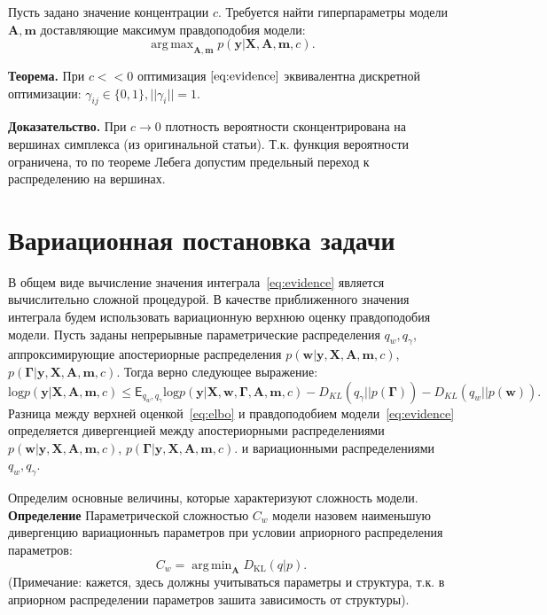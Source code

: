 \documentclass[12pt]{article}
\DeclareMathOperator*{\argmin}{arg\,min}
\DeclareMathOperator*{\argmax}{arg\,max}
\begin{document}
Пусть задано значение концентрации $c$. 
Требуется найти гиперпараметры модели $\mathbf{A}, \mathbf{m}$ доставляющие максимум правдоподобия модели:
\[
    \argmax_{\mathbf{A}, \mathbf{m}}  p(\mathbf{y}|\mathbf{X},\mathbf{A},\mathbf{m}, c).
\]

\textbf{Теорема.} При $c << 0$ оптимизация  $\eqref{eq:evidence}$ эквивалентна дискретной оптимизации: $\gamma_{ij} \in \{0, 1\}, ||\gamma_i|| = 1$. 

\textbf{Доказательство.} При $c \to 0$ плотность вероятности сконцентрирована на вершинах симплекса (из оригинальной статьи). Т.к. функция вероятности ограничена, то по теореме Лебега допустим предельный переход к распределению на вершинах.  


\section{Вариационная постановка задачи}
В общем виде вычисление значения интеграла~\eqref{eq:evidence} является вычислительно сложной процедурой. В качестве приближенного значения интеграла будем использовать вариационную верхнюю оценку правдоподобия модели. Пусть заданы непрерывные параметрические распределения $q_w, q_\gamma$, аппроксимирующие апостериорные распределения $p(\mathbf{w}|\mathbf{y}, \mathbf{X}, \mathbf{A},\mathbf{m}, c)$, $p(\boldsymbol{\Gamma}|\mathbf{y}, \mathbf{X}, \mathbf{A},\mathbf{m}, c).$ Тогда верно следующее выражение:
\begin{equation}
\label{eq:elbo}
    \text{log} p(\mathbf{y}|\mathbf{X},\mathbf{A},\mathbf{m}, c)  \leq \mathsf{E}_{q_w,q_\gamma}\text{log} p(\mathbf{y}|\mathbf{X},\mathbf{w}, \boldsymbol{\Gamma}, \mathbf{A},\mathbf{m}, c) - {D_{KL}}(q_\gamma||p(\boldsymbol{\Gamma})) - {D_{KL}}(q_{w}||p(\mathbf{w})).
\end{equation}
Разница между верхней оценкой~\eqref{eq:elbo} и правдоподобием модели~\eqref{eq:evidence} определяется дивергенцией между апостериорными распределениями $p(\mathbf{w}|\mathbf{y}, \mathbf{X}, \mathbf{A},\mathbf{m}, c)$, $p(\boldsymbol{\Gamma}|\mathbf{y}, \mathbf{X}, \mathbf{A},\mathbf{m}, c).$ и вариационными распределениями  $q_w, q_\gamma$.

Определим основные величины, которые характеризуют сложность модели. \\
\textbf{Определение} Параметрической сложностью $C_w$ модели назовем наименьшую дивергенцию вариационныъ параметров  при условии априорного распределения параметров:
\[
    C_w = \argmin_\mathbf{A} D_\text{KL}\left(q|p\right).
\]
(Примечание: кажется, здесь должны учитываться параметры и структура, т.к. в априорном распределении параметров зашита зависимость от структуры).
\end{document}
